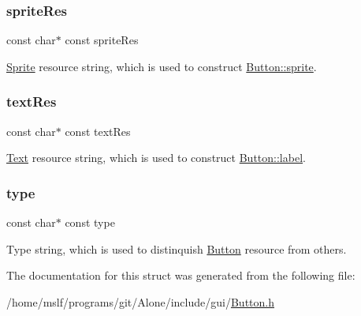 \subsubsection{\texorpdfstring{sprite\+Res}{spriteRes}}
{\footnotesize\ttfamily const char$\ast$ const sprite\+Res}

\hyperlink{struct_sprite}{Sprite} resource string, which is used to construct \hyperlink{struct_button_a1128327f94baacb1570a98fca0591108}{Button\+::sprite}. \hypertarget{struct_button_scene_node__parser_strings_ab8666a8039b6fdab629c3e0853421c3c}{}\label{struct_button_scene_node__parser_strings_ab8666a8039b6fdab629c3e0853421c3c} 
\subsubsection{\texorpdfstring{text\+Res}{textRes}}
{\footnotesize\ttfamily const char$\ast$ const text\+Res}

\hyperlink{struct_text}{Text} resource string, which is used to construct \hyperlink{struct_button_ab278201aa1758916bc9e825b3833e31b}{Button\+::label}. \hypertarget{struct_button_scene_node__parser_strings_a8ff938fb2f815be425fd2859a21e6d61}{}\label{struct_button_scene_node__parser_strings_a8ff938fb2f815be425fd2859a21e6d61} 
\subsubsection{\texorpdfstring{type}{type}}
{\footnotesize\ttfamily const char$\ast$ const type}

Type string, which is used to distinquish \hyperlink{struct_button}{Button} resource from others. 

The documentation for this struct was generated from the following file\+:\begin{DoxyCompactItemize}
\item 
/home/mslf/programs/git/\+Alone/include/gui/\hyperlink{_button_8h}{Button.\+h}\end{DoxyCompactItemize}
